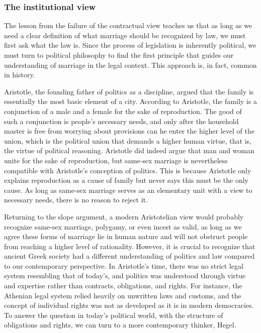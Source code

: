 \documentclass[man,floatsintext]{apa7}
\begin{document}
\subsubsection{The institutional view}

The lesson from the failure of the contractual view teaches us that as long as we need a clear definition of what marriage should be recognized by law, we must first ask what the law is.  Since the process of legislation is inherently political, we must turn to political philosophy to find the first principle that guides our understanding of marriage in the legal context. This approach is, in fact, common in history.

Aristotle, the founding father of politics as a discipline, argued that the family is essentially the most basic element of a city. According to Aristotle, the family is a conjunction of a male and a female for the sake of reproduction. The good of such a conjunction is people's necessary needs, and only after the household master is free from worrying about provisions can he enter the higher level of the union, which is the political union that demands a higher human virtue, that is, the virtue of political reasoning. Aristotle did indeed argue that man and woman unite for the sake of reproduction, but same-sex marriage is nevertheless compatible with Aristotle's conception of politics. This is because Aristotle only explains reproduction as a cause of family but never says this must be the only cause. As long as same-sex marriage serves as an elementary unit with a view to necessary needs, there is no reason to reject it.\autocite{aristotePolitics1984}

Returning to the slope argument, a modern Aristotelian view would probably recognize same-sex marriage, polygamy, or even incest as valid, as long as we agree these forms of marriage lie in human nature and will not obstruct people from reaching a higher level of rationality. However, it is crucial to recognize that ancient Greek society had a different understanding of politics and law compared to our contemporary perspective. In Aristotle's time, there was no strict legal system resembling that of today's, and politics was understood through virtue and expertise rather than contracts, obligations, and rights. For instance, the Athenian legal system relied heavily on unwritten laws and customs, and the concept of individual rights was not as developed as it is in modern democracies. To answer the question in today's political world, with the structure of obligations and rights, we can turn to a more contemporary thinker, Hegel.
\end{document}
